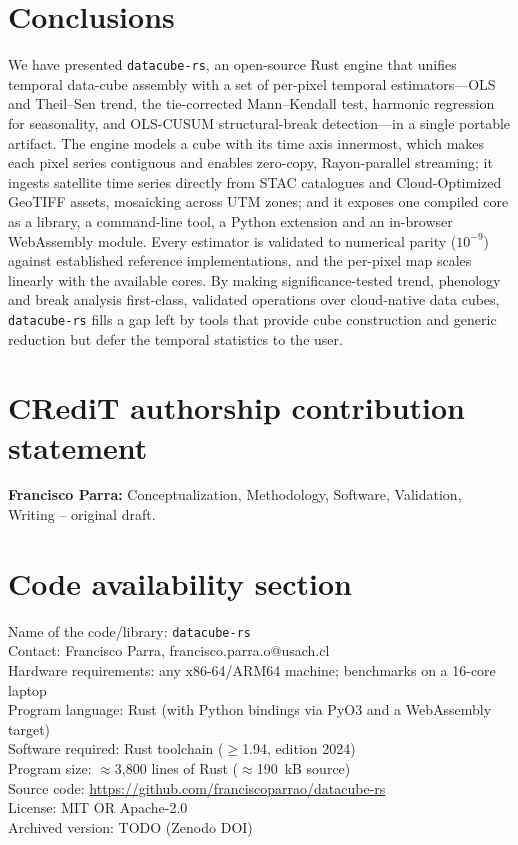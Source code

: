 \documentclass[review]{elsarticle}
\begin{document}
\section{Conclusions}
\label{sec:conclusions}

We have presented \texttt{datacube-rs}, an open-source Rust engine that unifies
temporal data-cube assembly with a set of per-pixel temporal estimators---OLS
and Theil--Sen trend, the tie-corrected Mann--Kendall test, harmonic regression
for seasonality, and OLS-CUSUM structural-break detection---in a single portable
artifact. The engine models a cube with its time axis innermost, which makes each
pixel series contiguous and enables zero-copy, Rayon-parallel streaming; it
ingests satellite time series directly from STAC catalogues and Cloud-Optimized
GeoTIFF assets, mosaicking across UTM zones; and it exposes one compiled core as a
library, a command-line tool, a Python extension and an in-browser WebAssembly
module. Every estimator is validated to numerical parity ($10^{-9}$) against
established reference implementations, and the per-pixel map scales linearly with
the available cores. By making significance-tested trend, phenology and break
analysis first-class, validated operations over cloud-native data cubes,
\texttt{datacube-rs} fills a gap left by tools that provide cube construction and
generic reduction but defer the temporal statistics to the user.

\section*{CRediT authorship contribution statement}
\textbf{Francisco Parra:} Conceptualization, Methodology, Software, Validation,
Writing -- original draft.

\section*{Code availability section}
\noindent
Name of the code/library: \texttt{datacube-rs}\\
Contact: Francisco Parra, francisco.parra.o@usach.cl\\
Hardware requirements: any x86-64/ARM64 machine; benchmarks on a 16-core laptop\\
Program language: Rust (with Python bindings via PyO3 and a WebAssembly target)\\
Software required: Rust toolchain ($\geq$1.94, edition 2024)\\
Program size: $\approx$3{,}800 lines of Rust ($\approx$190~kB source)\\
Source code: \url{https://github.com/franciscoparrao/datacube-rs}\\
License: MIT OR Apache-2.0\\
Archived version: TODO (Zenodo DOI)
\end{document}
